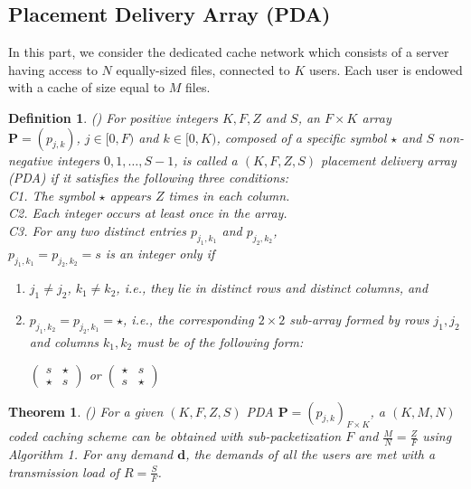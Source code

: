\documentclass[conference,a4paper,10pt]{IEEEtran}
\newtheorem{thm}{Theorem}
\newtheorem{defn}{Definition}
\begin{document}
\subsection{Placement Delivery Array (PDA)}
In this part, we consider the dedicated cache network which consists of a server having access to $N$ equally-sized files, connected to $K$ users. Each user is endowed with a cache of size equal to $M$ files.
\begin{defn}
	(\cite{YCT}) For positive integers $K, F, Z$ and $S$, an $F \times K$ array $\mathbf{P}=(p_{j,k})$, $j \in [0,F)$ and $k \in [0,K)$, composed of a specific symbol $\star$ and $S$ non-negative integers $0,1,\ldots, S-1$, is called a $(K,F,Z,S)$ placement delivery array (PDA) if it satisfies the following three conditions: \\
	\textit{C1}. The symbol $\star$ appears $Z$ times in each column.\\
	\textit{C2}. Each integer occurs at least once in the array.\\
	\textit{C3}. For any two distinct entries $p_{j_1,k_1}$ and $p_{j_2,k_2}$,\\ $p_{j_1,k_1}=p_{j_2,k_2}=s$ is an integer only if
	\begin{enumerate}[label=(\alph*)]
		
		\item $j_1 \neq j_2$, $k_1 \neq k_2$, i.e., they lie in distinct rows and distinct columns, and
		\item $p_{j_1,k_2}=p_{j_2,k_1}=\star$, i.e., the corresponding $2\times2$ sub-array formed by rows $j_1, j_2$ and columns $k_1,k_2$ must be of the following form:\\
		\begin{center}
			$\begin{pmatrix}
			s & \star\\
			\star & s
			\end{pmatrix}$
			\hspace{0.3cm}or\hspace{0.3cm}
			$\begin{pmatrix}
			\star & s \\
			s & \star
			\end{pmatrix}$ 
			
		\end{center}
		
	\end{enumerate}
\end{defn}

\begin{thm}
	(\cite{YCT}) For a given $(K, F, Z, S)$ PDA $\mathbf{P}=(p_{j,k})_{F \times K}$, a $(K,M,N)$ coded caching scheme can be obtained with sub-packetization $F$ and $\frac{M}{N}=\frac{Z}{F}$ using Algorithm 1. For any demand $\mathbf{d}$, the demands of all the users are met with a transmission load of $R=\frac{S}{F}$.
\end{thm}
\end{document}

